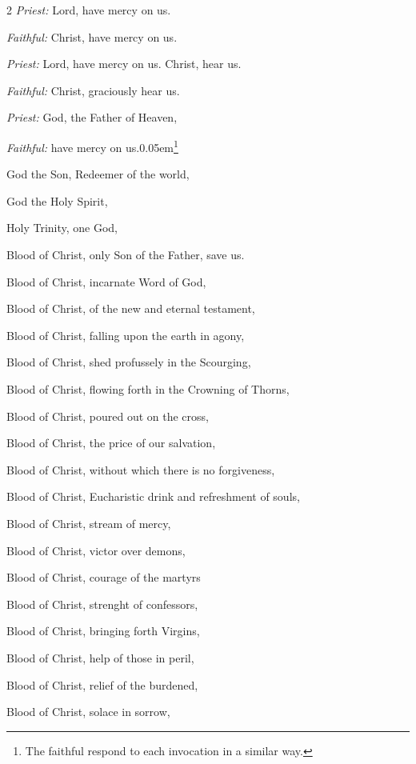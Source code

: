 \begin{enpars}
\begin{multicols}{2}
\raggedcolumns 
\textit{Priest:}  Lord, have mercy on us.

\textit{Faithful:} Christ, have mercy on us.

\textit{Priest:}  Lord, have mercy on us. Christ, hear us.

\textit{Faithful:} Christ, graciously hear us.

\textit{Priest:}  God, the Father of Heaven,

\textit{Faithful:} have mercy on us.\kern 0.05em\footnote{\raggedright{The faithful respond to each invocation in a similar way.}\par}

God the Son, Redeemer of the world,

God the Holy Spirit,

Holy Trinity, one God,

Blood of Christ, only Son of the Father, save us.

Blood of Christ, incarnate Word of God,

Blood of Christ, of the new and eternal testament,

Blood of Christ, falling upon the earth in agony,

Blood of Christ, shed profussely in the Scourging,

Blood of Christ, flowing forth in the Crowning of Thorns,

Blood of Christ, poured out on the cross,

Blood of Christ, the price of our salvation,

Blood of Christ, without which there is no forgiveness,

Blood of Christ, Eucharistic drink and refreshment of souls,


Blood of Christ, stream of mercy,

Blood of Christ, victor over demons,

Blood of Christ, courage of the martyrs

Blood of Christ, strenght of confessors,

Blood of Christ, bringing forth Virgins,

Blood of Christ, help of those in peril,

Blood of Christ, relief of the burdened,

Blood of Christ, solace in sorrow,


\end{multicols}
\end{enpars}
